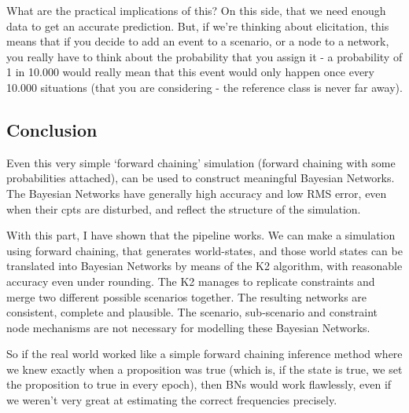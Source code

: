 What are the practical implications of this? On this side, that we need enough data to get an accurate prediction. But, if we're thinking about elicitation, this means that if you decide to add an event to a scenario, or a node to a network, you really have to think about the probability that you assign it - a probability of 1 in 10.000 would really mean that this event would only happen once every 10.000 situations (that you are considering - the reference class is never far away). 




\subsection{Conclusion}
Even this very simple `forward chaining' simulation (forward chaining with some probabilities attached), can be used to construct meaningful Bayesian Networks. The Bayesian Networks have generally high accuracy and low RMS error, even when their cpts are disturbed, and reflect the structure of the simulation. 

With this part, I have shown that the pipeline works. We can make a simulation using forward chaining, that generates world-states, and those world states can be translated into Bayesian Networks by means of the K2 algorithm, with reasonable accuracy even under rounding. The K2 manages to replicate constraints and merge two different possible scenarios together. The resulting networks are consistent, complete and plausible. The scenario, sub-scenario and constraint node mechanisms are not necessary for modelling these Bayesian Networks.

So if the real world worked like a simple forward chaining inference method where we knew exactly when a proposition was true (which is, if the state is true, we set the proposition to true in every epoch), then BNs would work flawlessly, even if we weren't very great at estimating the correct frequencies precisely.






